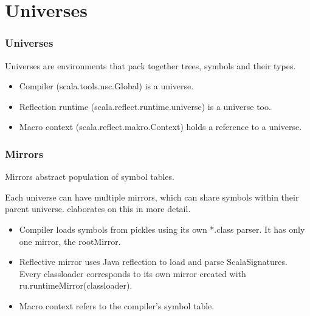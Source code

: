 \documentclass[hyperref={bookmarks=false}]{beamer}
\begin{document}
\section{Universes}

\begin{frame}[fragile]
\frametitle{Universes}

Universes are environments that pack together trees, symbols and their types.

\begin{itemize}
\item Compiler (scala.tools.nsc.Global) is a universe.
\item Reflection runtime (scala.reflect.runtime.universe) is a universe too.
\item Macro context (scala.reflect.makro.Context) holds a reference to a universe.
\end{itemize}
\end{frame}

\begin{frame}[fragile]
\frametitle{Mirrors}

Mirrors abstract population of symbol tables.

Each universe can have multiple mirrors, which can share symbols within their parent universe.  elaborates on this in more detail.

\begin{itemize}
\item Compiler loads symbols from pickles using its own *.class parser. It has only one mirror, the rootMirror.
\item Reflective mirror uses Java reflection to load and parse ScalaSignatures. Every classloader corresponds to its own mirror created with ru.runtimeMirror(classloader).
\item Macro context refers to the compiler's symbol table.
\end{itemize}
\end{frame}
\end{document}
